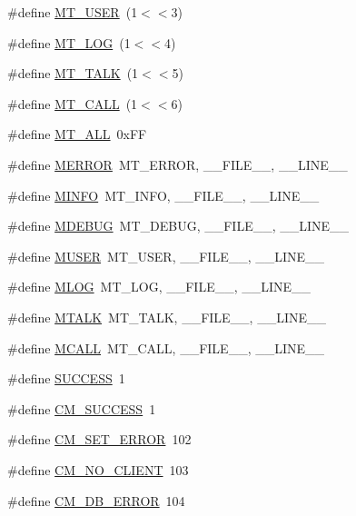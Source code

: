 \begin{DoxyCompactItemize}
\item 
\#define \hyperlink{group__mdefineh_ga8e13ab6bdea106f548ecb162bdcd41a9}{MT\_\-USER}~(1$<$$<$3)
\item 
\#define \hyperlink{group__mdefineh_gaa2290e1318f8605a3e59acf7112ba738}{MT\_\-LOG}~(1$<$$<$4)
\item 
\#define \hyperlink{group__mdefineh_ga7d9c4230376d6527c7c8cd810eeb3e86}{MT\_\-TALK}~(1$<$$<$5)
\item 
\#define \hyperlink{group__mdefineh_gadcbf4bac0ba5a2fb4e81ed727775dbba}{MT\_\-CALL}~(1$<$$<$6)
\item 
\#define \hyperlink{group__mdefineh_ga3378bf6f53a24392145df33c8acc9c0c}{MT\_\-ALL}~0xFF
\item 
\#define \hyperlink{group__mdefineh_gac2d967025ca0f84f611d568f4ede934a}{MERROR}~MT\_\-ERROR, \_\-\_\-FILE\_\-\_\-, \_\-\_\-LINE\_\-\_\-
\item 
\#define \hyperlink{group__mdefineh_ga6e27d8876a43afce3ee4dd16527cbb9e}{MINFO}~MT\_\-INFO,  \_\-\_\-FILE\_\-\_\-, \_\-\_\-LINE\_\-\_\-
\item 
\#define \hyperlink{group__mdefineh_gad769dc7be0dc5189e019d56664a18655}{MDEBUG}~MT\_\-DEBUG, \_\-\_\-FILE\_\-\_\-, \_\-\_\-LINE\_\-\_\-
\item 
\#define \hyperlink{group__mdefineh_ga34e08186e736dbd7f0b61a23a8ad8d0f}{MUSER}~MT\_\-USER,  \_\-\_\-FILE\_\-\_\-, \_\-\_\-LINE\_\-\_\-
\item 
\#define \hyperlink{group__mdefineh_ga953a810cf5034c603bdcad8840223ddc}{MLOG}~MT\_\-LOG,   \_\-\_\-FILE\_\-\_\-, \_\-\_\-LINE\_\-\_\-
\item 
\#define \hyperlink{group__mdefineh_gad6a8d32f94873258d0eebcbe5b24a78e}{MTALK}~MT\_\-TALK,  \_\-\_\-FILE\_\-\_\-, \_\-\_\-LINE\_\-\_\-
\item 
\#define \hyperlink{group__mdefineh_ga9f2fa3417c41f059c815b9c0eba73db2}{MCALL}~MT\_\-CALL,  \_\-\_\-FILE\_\-\_\-, \_\-\_\-LINE\_\-\_\-
\item 
\#define \hyperlink{group__err21_gaa90cac659d18e8ef6294c7ae337f6b58}{SUCCESS}~1
\item 
\#define \hyperlink{group__err21_ga0180947941230d805f5dbb6f1801c17c}{CM\_\-SUCCESS}~1
\item 
\#define \hyperlink{group__err21_ga2559211d26add70c0fdc21958ed0e9e1}{CM\_\-SET\_\-ERROR}~102
\item 
\#define \hyperlink{group__err21_gaae1164bcc7a30753d96723b897ce234e}{CM\_\-NO\_\-CLIENT}~103
\item 
\#define \hyperlink{group__err21_gad7158e389b0aa1f99cb40adb80b2bace}{CM\_\-DB\_\-ERROR}~104

\end{DoxyCompactItemize}

